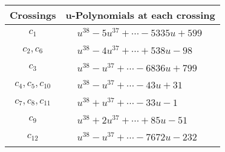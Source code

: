 \documentclass[1p]{elsarticle_modified}
\theoremstyle{definition}
\begin{document}
\begin{tabular}{m{50pt}|m{274pt}}
Crossings & \hspace{64pt}u-Polynomials at each crossing \\
\hline $$\begin{aligned}c_{1}\end{aligned}$$&$\begin{aligned}
&u^{38}-5 u^{37}+\cdots-5335 u+599
\end{aligned}$\\
\hline $$\begin{aligned}c_{2},c_{6}\end{aligned}$$&$\begin{aligned}
&u^{38}-4 u^{37}+\cdots+538 u-98
\end{aligned}$\\
\hline $$\begin{aligned}c_{3}\end{aligned}$$&$\begin{aligned}
&u^{38}- u^{37}+\cdots-6836 u+799
\end{aligned}$\\
\hline $$\begin{aligned}c_{4},c_{5},c_{10}\end{aligned}$$&$\begin{aligned}
&u^{38}- u^{37}+\cdots-43 u+31
\end{aligned}$\\
\hline $$\begin{aligned}c_{7},c_{8},c_{11}\end{aligned}$$&$\begin{aligned}
&u^{38}+u^{37}+\cdots-33 u-1
\end{aligned}$\\
\hline $$\begin{aligned}c_{9}\end{aligned}$$&$\begin{aligned}
&u^{38}+2 u^{37}+\cdots+85 u-51
\end{aligned}$\\
\hline $$\begin{aligned}c_{12}\end{aligned}$$&$\begin{aligned}
&u^{38}- u^{37}+\cdots-7672 u-232
\end{aligned}$\\
\hline
\end{tabular}\\~\\
\newpage\renewcommand{\arraystretch}{1}
\end{document}
